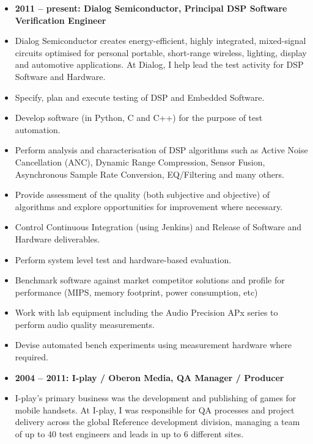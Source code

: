 \documentclass[a4paper,10pt]{article}
\begin{document}
\begin{itemize}[align=left]
\item[] \textbf{2011 – present: Dialog Semiconductor, Principal DSP Software Verification Engineer}
\item[] Dialog Semiconductor creates energy-efficient, highly integrated,
  mixed-signal circuits optimised for personal portable, short-range wireless,
    lighting, display and automotive applications. At Dialog, I help lead the
    test activity for DSP Software and Hardware.
\\
\end{itemize}

\begin{itemize}[label=\FilledSmallSquare, leftmargin=50pt]
\item Specify, plan and execute testing of DSP and Embedded Software.
\item Develop software (in Python, C and C++) for the purpose of test automation.
\item Perform analysis and characterisation of DSP algorithms such as Active Noise Cancellation (ANC), Dynamic Range Compression, Sensor Fusion, Asynchronous Sample Rate Conversion, EQ/Filtering and many others.
\item Provide assessment of the quality (both subjective and objective) of algorithms and explore opportunities for improvement where necessary.
\item Control Continuous Integration (using Jenkins) and Release of Software and Hardware deliverables.
\item Perform system level test and hardware-based evaluation.
\item Benchmark software against market competitor solutions and profile for performance (MIPS, memory footprint, power consumption, etc)
\item Work with lab equipment including the Audio Precision APx series to perform audio quality measurements.
\item Devise automated bench experiments using measurement hardware where required.
\\
\end{itemize}

\begin{itemize}[align=left]
\item[] \textbf{2004 – 2011: I-play / Oberon Media, QA Manager / Producer}
\item[] I-play’s primary business was the development and publishing of games
  for mobile handsets. At I-play, I was responsible for QA processes and
    project delivery across the global Reference development division, managing
    a team of up to 40 test engineers and leads in up to 6 different sites.
\\
\end{itemize}
\end{document}
